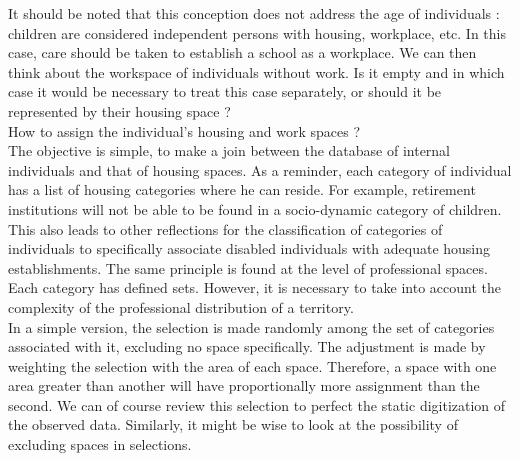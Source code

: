 It should be noted that this conception does not address the age of individuals : children are considered independent persons with housing, workplace, etc. In this case, care should be taken to establish a school as a workplace. We can then think about the workspace of individuals without work. Is it empty and in which case it would be necessary to treat this case separately, or should it be represented by their housing space ?\\

How to assign the individual's housing and work spaces ?\\

The objective is simple, to make a join between the database of internal individuals and that of housing spaces. As a reminder, each category of individual has a list of housing categories where he can reside. For example, retirement institutions will not be able to be found in a socio-dynamic category of children. This also leads to other reflections for the classification of categories of individuals to specifically associate disabled individuals with adequate housing establishments. The same principle is found at the level of professional spaces. Each category has defined sets. However, it is necessary to take into account the complexity of the professional distribution of a territory.\\

In a simple version, the selection is made randomly among the set of categories associated with it, excluding no space specifically. The adjustment is made by weighting the selection with the area of each space. Therefore, a space with one area greater than another will have proportionally more assignment than the second. We can of course review this selection to perfect the static digitization of the observed data. Similarly, it might be wise to look at the possibility of excluding spaces in selections.\\

